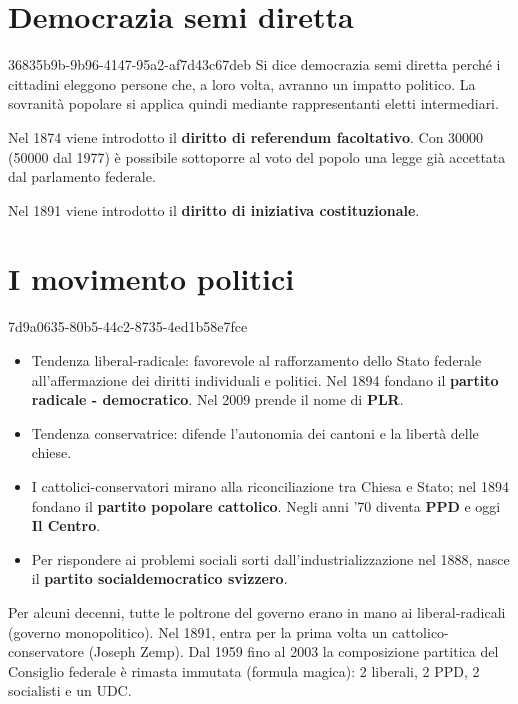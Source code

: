 \documentclass[preview]{standalone}
\begin{document}
\section{Democrazia semi diretta}

\begin{snippet}{36835b9b-9b96-4147-95a2-af7d43c67deb}
    Si dice democrazia semi diretta perché i cittadini eleggono persone che, a loro volta,
    avranno un impatto politico.
    La sovranità popolare si applica quindi mediante rappresentanti eletti intermediari.
    
    Nel 1874 viene introdotto il \textbf{diritto di referendum facoltativo}.
    Con 30000 (50000 dal 1977) è possibile sottoporre al voto del popolo una legge già accettata dal parlamento federale.
    
    Nel 1891 viene introdotto il \textbf{diritto di iniziativa costituzionale}.
\end{snippet}

\section{I movimento politici}

\begin{snippet}{7d9a0635-80b5-44c2-8735-4ed1b58e7fce}
    \begin{itemize}
        \item Tendenza liberal-radicale: favorevole al rafforzamento dello Stato federale all'affermazione dei diritti individuali e politici.
        Nel 1894 fondano il \textbf{partito radicale - democratico}.
        Nel 2009 prende il nome di \textbf{PLR}.
        \item Tendenza conservatrice: difende l'autonomia dei cantoni e la libertà delle chiese.
        \item I cattolici-conservatori mirano alla riconciliazione tra Chiesa e Stato; nel 1894 fondano il \textbf{partito popolare cattolico}.
        Negli anni '70 diventa \textbf{PPD} e oggi \textbf{Il Centro}.
        \item Per rispondere ai problemi sociali sorti dall'industrializzazione nel 1888, nasce il \textbf{partito socialdemocratico svizzero}.
    \end{itemize}
    
    Per alcuni decenni, tutte le poltrone del governo erano in mano ai liberal-radicali (governo monopolitico).
    Nel 1891, entra per la prima volta un cattolico-conservatore (Joseph Zemp).
    Dal 1959 fino al 2003 la composizione partitica del Consiglio federale è rimasta immutata (formula magica):
    2 liberali, 2 PPD, 2 socialisti e un UDC.
\end{snippet}
\end{document}
